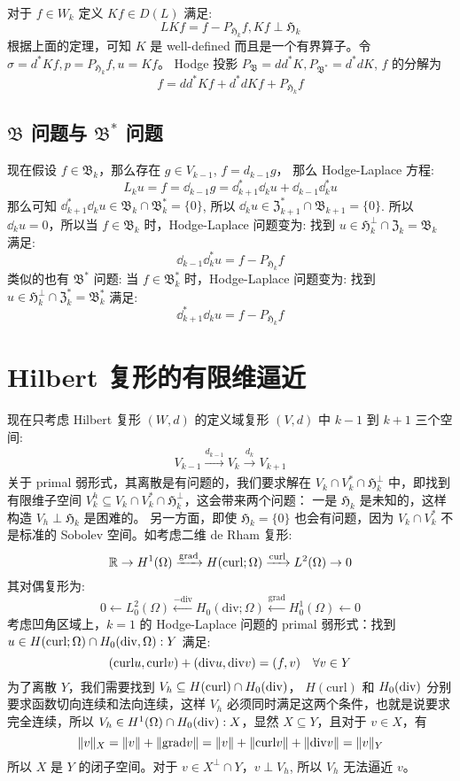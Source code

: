 \documentclass[lang=cn,a4paper,newtx]{elegantpaper}
\begin{document}
对于 $f \in W_k$ 定义 $Kf \in D(L)$ 满足:
$$
LKf = f - P_{\mathfrak{H}_k} f, Kf \perp \mathfrak{H}_k
$$
根据上面的定理，可知 $K$ 是 well-defined 而且是一个有界算子。令
$\sigma = d^* Kf, p = P_{\mathfrak{H}_k} f, u = Kf$。 Hodge 投影
$P_{\mathfrak{B}} = dd^*K, P_{\mathfrak{B}^*} = d^*dK$, $f$ 的分解为
$$
f = dd^*Kf + d^*dKf + P_{\mathfrak{H}_k} f
$$

\subsection{$\mathfrak{B}$ 问题与 $\mathfrak{B}^*$ 问题}
现在假设 $f \in \mathfrak{B}_k$，那么存在 $g \in V_{k-1}$, $f = d_{k-1} g$，
那么 Hodge-Laplace 方程:
$$
L_k u = f = \dd_{k-1} g = \dd_{k+1}^* \dd_{k} u + \dd_{k-1} \dd_{k}^* u
$$
那么可知 $\dd_{k+1}^* \dd_{k} u \in \mathfrak{B}_{k} \cap \mathfrak{B}_k^* =
\{0\}$, 所以 $\dd_k u \in \mathfrak{Z}_{k+1}^* \cap \mathfrak{B}_{k+1} = \{0\}$. 
所以 $\dd_k u = 0$，所以当 $f \in \mathfrak{B}_k$ 时，Hodge-Laplace 问题变为:
找到 $u \in \mathfrak{H}_k^{\perp}\cap \mathfrak{Z}_k = \mathfrak{B}_k$ 满足:
$$
\dd_{k-1} \dd_{k}^* u = f - P_{\mathfrak{H}_k} f
$$
类似的也有 $\mathfrak{B}^*$ 问题: 当 $f \in \mathfrak{B}_k^*$ 时，Hodge-Laplace 问题变为:
找到 $u \in \mathfrak{H}_k^{\perp}\cap \mathfrak{Z}_k^* = \mathfrak{B}_k^*$ 满足:
$$
\dd_{k+1}^* \dd_{k} u = f - P_{\mathfrak{H}_k} f
$$



\section{Hilbert 复形的有限维逼近}
现在只考虑 Hilbert 复形 $(W, d)$ 的定义域复形 $(V, d)$ 中 $k-1$ 到 $k+1$
三个空间:
\begin{align}
\label{threedomaincomplex}
V_{k-1} \xrightarrow{d_{k-1}} V_k \xrightarrow{d_k} V_{k+1}
\end{align}
关于 primal 弱形式，其离散是有问题的，我们要求解在 $V_k\cap V_k^*\cap
\mathfrak{H}_k^{\perp}$ 中，即找到有限维子空间 $V_k^h \subseteq V_k \cap V_k^* \cap
\mathfrak{H}_k^{\perp}$，这会带来两个问题：
一是 $\mathfrak{H}_k$ 是未知的，这样构造 $V_h\perp \mathfrak{H}_k$ 是困难的。
另一方面，即使 $\mathfrak{H}_k = \{0\}$ 也会有问题，因为 $V_k\cap V_k^*$
不是标准的 Sobolev 空间。如考虑二维 de Rham 复形:
$$
\mathbb{R} \to H^1(\Omega) \xrightarrow{\mathrm{grad}} H(\mathrm{curl}; \Omega)
\xrightarrow{\mathrm{curl}} L^2(\Omega) \to 0
$$
其对偶复形为:
$$
0 \leftarrow L^2_0(\Omega) \xleftarrow{-\mathrm{div}} H_0(\mathrm{div}; \Omega)
\xleftarrow{\mathrm{grad}} H_0^1(\Omega) \leftarrow 0
$$
考虑凹角区域上，$k=1$ 的 Hodge-Laplace 问题的 primal 弱形式：找到 
$u \in H(\mathrm{curl}; \Omega)\cap H_0(\mathrm{div}, \Omega): Y$ 满足:
$$
(\mathrm{curl} u, \mathrm{curl} v) + (\mathrm{div} u, \mathrm{div} v) = (f, v) \quad \forall v \in Y
$$
为了离散 $Y$，我们需要找到 $V_h \subseteq H(\mathrm{curl}) \cap H_0(\mathrm{div})$，
$H(\mathrm{curl})$ 和 $H_0(\mathrm{div})$ 分别要求函数切向连续和法向连续，这样 $V_h$
必须同时满足这两个条件，也就是说要求完全连续，所以 $V_h \in H^1(\Omega) \cap
H_0(\mathrm{div}): X$，显然 $X \subseteq Y$，且对于 $v \in X$，有
$$
\|v\|_X  = \|v\| + \|\mathrm{grad} v\| = \|v\| + \|\mathrm{curl} v\| + \|\mathrm{div} v\| = \|v\|_Y
$$
所以 $X$ 是 $Y$ 的闭子空间。对于 $v \in X^{\perp} \cap Y$，$v \perp V_h$,
所以 $V_h$ 无法逼近 $v$。
\end{document}
